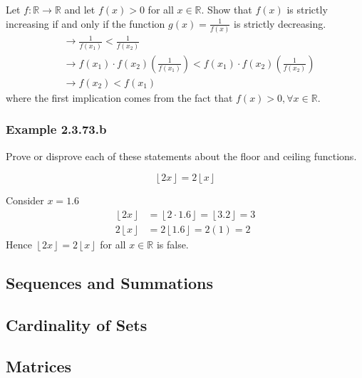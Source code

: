 \documentclass{article}
\begin{document}
Let $ f: \mathbb{R} \rightarrow \mathbb{R} $ and let $ f(x) > 0 $ for all $ x \in \mathbb{R} $. Show that $ f(x) $ is strictly increasing if and only if the function $ g(x) = \frac{ 1 }{ f(x) } $ is strictly decreasing.
\begin{align*}
	 & \rightarrow \frac{ 1 }{ f(x_1) } < \frac{ 1 }{ f(x_2) }                                                                       \\
	 & \rightarrow f(x_1) \cdot f(x_2) \left( \frac{ 1 }{ f(x_1) } \right) < f(x_1) \cdot f(x_2) \left( \frac{ 1 }{ f(x_2) } \right) \\
	 & \rightarrow f(x_2) < f(x_1)
\end{align*}
where the first implication comes from the fact that $ f(x) > 0, \forall x \in \mathbb{R} $.

\subsubsection{Example 2.3.73.b}

Prove or disprove each of these statements about the floor and ceiling functions.

\begin{equation*}
	\left\lfloor 2x \right\rfloor = 2 \left\lfloor x \right\rfloor
\end{equation*}

Consider $ x = 1.6 $
\begin{align*}
	\left\lfloor 2x \right\rfloor  & = \left\lfloor 2 \cdot 1.6 \right\rfloor = \left\lfloor 3.2 \right\rfloor = 3 \\
	2 \left\lfloor x \right\rfloor & = 2 \left\lfloor 1.6 \right\rfloor = 2(1) = 2
\end{align*}
Hence $ \left\lfloor 2x \right\rfloor = 2 \left\lfloor x \right\rfloor $ for all $ x \in \mathbb{R} $ is false.

\subsection{Sequences and Summations}

\subsection{Cardinality of Sets}

\subsection{Matrices}
\end{document}

